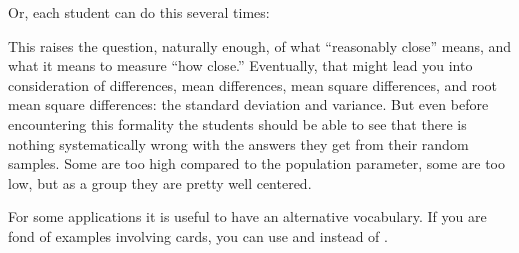 Or, each student can do this several times:
%
\begin{knitrout}
\end{knitrout}

This raises the question, naturally enough, of what ``reasonably
close'' means, and what it means to measure ``how close.''
Eventually, that might lead you into consideration of differences,
mean differences, mean square differences, and root mean square
differences: the standard deviation and variance.  But even before
encountering this formality the
students should be able to see that there is nothing systematically
wrong with the answers they get from their random samples.  Some are too high compared to the
population parameter, some are too low, but as a group they are pretty
well centered.

For some applications it is useful to have an alternative vocabulary.  If you are fond
of examples involving cards, you can use  and 
instead of .
\begin{knitrout}
\end{knitrout}

